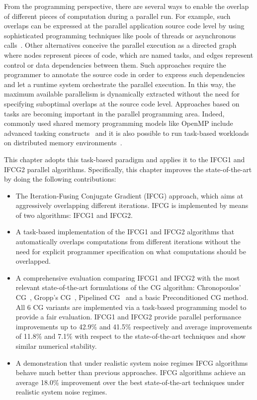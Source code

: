 From the programming perspective, there are several ways to enable the overlap of different pieces of computation during a parallel run.
For example, such overlaps can be expressed at the parallel application source code level by using sophisticated programming techniques like pools of threads or asynchronous calls~\cite{Bienia08}.
Other alternatives conceive the parallel execution as a directed graph where nodes represent pieces of code, which are named tasks, and edges represent control or data dependencies between them.
Such approaches require the programmer to annotate the source code in order to express such dependencies and let a runtime system orchestrate the parallel execution.
In this way, the maximum available parallelism is dynamically extracted without the need for specifying suboptimal overlaps at the source code level.
Approaches based on tasks are becoming important in the parallel programming area.
Indeed, commonly used shared memory programming models like OpenMP include advanced tasking constructs~\cite{OpenMP4.0} and it is also possible to run task-based workloads on distributed memory environments~\cite{Bueno13}.
 
This chapter adopts this task-based paradigm and applies it to the IFCG1 and IFCG2 parallel algorithms. 
Specifically, this chapter improves the state-of-the-art by doing the following contributions:
\begin{itemize}
       \item The Iteration-Fusing Conjugate Gradient (IFCG) approach, which aims at aggressively overlapping different iterations. IFCG is implemented by means of two algorithms: IFCG1 and IFCG2. 
       \item A task-based implementation of the IFCG1 and IFCG2 algorithms that automatically overlaps computations from different iterations without the need for explicit programmer specification on what computations should be overlapped.
       \item A comprehensive evaluation comparing IFCG1 and IFCG2 with the most relevant state-of-the-art formulations of the CG algorithm: Chronopoulos' CG~\cite{chronopoulos89}, Gropp's CG~\cite{gropp10}, Pipelined CG~\cite{ghysels14} and a basic Preconditioned CG method. All 6 CG variants are implemented via a task-based programming model to provide a fair evaluation. IFCG1 and IFCG2 provide parallel performance improvements up to 42.9\% and 41.5\% respectively and average improvements of 11.8\% and 7.1\% with respect to the state-of-the-art techniques and show similar numerical stability.
	\item A demonstration that under realistic system noise regimes IFCG algorithms behave much better than previous approaches. IFCG algorithms achieve an average 18.0\% improvement over the best state-of-the-art techniques under realistic system noise regimes.
\end{itemize}
 
